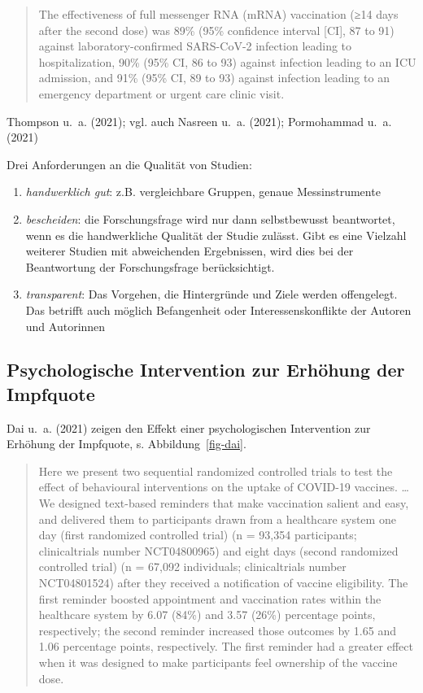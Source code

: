 \documentclass[
  a4paper,
  DIV=11]{scrreprt}
\providecommand{\tightlist}{%
  \setlength{\itemsep}{0pt}\setlength{\parskip}{0pt}}\usepackage{longtable,booktabs,array}
\theoremstyle{definition}
\theoremstyle{remark}
\begin{document}
\begin{quote}
The effectiveness of full messenger RNA (mRNA) vaccination (≥14 days
after the second dose) was 89\% (95\% confidence interval {[}CI{]}, 87
to 91) against laboratory-confirmed SARS-CoV-2 infection leading to
hospitalization, 90\% (95\% CI, 86 to 93) against infection leading to
an ICU admission, and 91\% (95\% CI, 89 to 93) against infection leading
to an emergency department or urgent care clinic visit.
\end{quote}

Thompson u.~a. (2021); vgl. auch Nasreen u.~a. (2021); Pormohammad u.~a.
(2021)

Drei Anforderungen an die Qualität von Studien:

\begin{enumerate}
\def\labelenumi{\arabic{enumi}.}
\tightlist
\item
  \emph{handwerklich gut}: z.B. vergleichbare Gruppen, genaue
  Messinstrumente
\item
  \emph{bescheiden}: die Forschungsfrage wird nur dann selbstbewusst
  beantwortet, wenn es die handwerkliche Qualität der Studie zulässt.
  Gibt es eine Vielzahl weiterer Studien mit abweichenden Ergebnissen,
  wird dies bei der Beantwortung der Forschungsfrage berücksichtigt.
\item
  \emph{transparent}: Das Vorgehen, die Hintergründe und Ziele werden
  offengelegt. Das betrifft auch möglich Befangenheit oder
  Interessenskonflikte der Autoren und Autorinnen
\end{enumerate}

\hypertarget{psychologische-intervention-zur-erhuxf6hung-der-impfquote}{%
\subsection{Psychologische Intervention zur Erhöhung der
Impfquote}\label{psychologische-intervention-zur-erhuxf6hung-der-impfquote}}

Dai u.~a. (2021) zeigen den Effekt einer psychologischen Intervention
zur Erhöhung der Impfquote, s. Abbildung~\ref{fig-dai}.

\begin{quote}
Here we present two sequential randomized controlled trials to test the
effect of behavioural interventions on the uptake of COVID-19 vaccines.
\ldots{} We designed text-based reminders that make vaccination salient
and easy, and delivered them to participants drawn from a healthcare
system one day (first randomized controlled trial) (n = 93,354
participants; clinicaltrials number NCT04800965) and eight days (second
randomized controlled trial) (n = 67,092 individuals; clinicaltrials
number NCT04801524) after they received a notification of vaccine
eligibility. The first reminder boosted appointment and vaccination
rates within the healthcare system by 6.07 (84\%) and 3.57 (26\%)
percentage points, respectively; the second reminder increased those
outcomes by 1.65 and 1.06 percentage points, respectively. The first
reminder had a greater effect when it was designed to make participants
feel ownership of the vaccine dose.
\end{quote}
\end{document}
